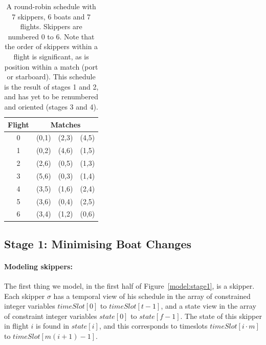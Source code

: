 \documentclass{llncs}
\newcommand{\timeSlot}{\mathit{timeSlot}}
\newcommand{\state}{\mathit{state}}
\begin{document}
\begin{table}
    \setlength{\tabcolsep}{3pt}
    \begin{tabular}{cccc}
        \toprule
        Flight & \multicolumn{3}{c}{Matches} \\ \midrule
        0 & (0,1) & (2,3) & (4,5) \\
        1 & (0,2) & (4,6) & (1,5) \\
        2 & (2,6) & (0,5) & (1,3) \\
        3 & (5,6) & (0,3) & (1,4) \\
        4 & (3,5) & (1,6) & (2,4) \\
        5 & (3,6) & (0,4) & (2,5) \\
        6 & (3,4) & (1,2) & (0,6) \\ \bottomrule
    \end{tabular}
    \caption{A round-robin schedule with 7 skippers, 6 boats and 7 flights.  Skippers are numbered 0
        to 6. Note that the order of skippers within a flight is significant, as is position within
        a match (port or starboard). This schedule is the result of stages 1 and 2, and has yet to
        be renumbered and oriented (stages 3 and 4).} \label{tab1}
\end{table}

\subsection{Stage 1: Minimising Boat Changes}

\paragraph{Modeling skippers:} The first thing we model, in the first half of
Figure~\ref{model:stage1}, is a skipper. Each skipper $\sigma$ has a temporal view of his schedule
in the array of constrained integer variables $\timeSlot[0]$ to $\timeSlot[{t-1}]$, and a state view
in the array of constraint integer variables $\state[0]$ to $\state[{f-1}]$. The state of this
skipper in flight $i$ is found in $\state[i]$, and this corresponds to timeslots $\timeSlot[{i \cdot
m}]$ to $\timeSlot[{m(i+1)-1}]$.
\end{document}
